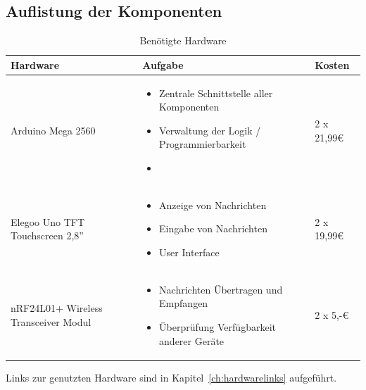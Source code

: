 \documentclass[a4paper, 11pt]{scrartcl}
\begin{document}
\subsection{Auflistung der Komponenten}
\begin{small}

\begin{table}[H]
    \caption{Benötigte Hardware}\label{tab:hardware}
    \begin{tabular}{|p{}|p{}|p{}|}
        \hline
        \textbf{Hardware} & \textbf{Aufgabe} & \textbf{Kosten}
        \\
        \hline\hline
        Arduino Mega 2560 
        & 
        \begin{itemize}
            \item Zentrale Schnittstelle aller Komponenten
            \item Verwaltung der Logik / Programmierbarkeit
            \item 
        \end{itemize} 
        & 
        2 x 21,99€
        \\
        \hline
        Elegoo Uno TFT Touchscreen 2,8''
        &
        \begin{itemize}
            \item Anzeige von Nachrichten
            \item Eingabe von Nachrichten
            \item User Interface
        \end{itemize}
        &
        2 x 19,99€
        \\
        \hline
        nRF24L01+ Wireless Transceiver Modul
        &
        \begin{itemize}
            \item Nachrichten Übertragen und Empfangen
            \item Überprüfung Verfügbarkeit anderer Geräte
        \end{itemize}
        &
        2 x 5,-€
        \\
        \hline
    \end{tabular}
\end{table}
Links zur genutzten Hardware sind in Kapitel~\ref{ch:hardwarelinks} aufgeführt.


\end{small}
\end{document}
